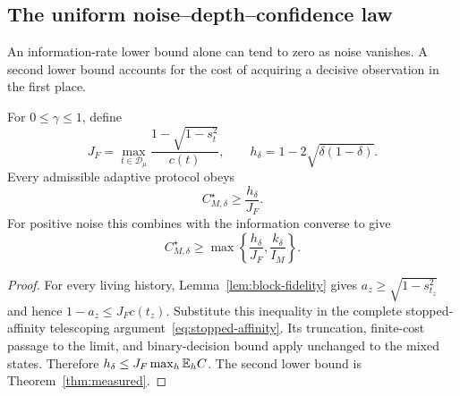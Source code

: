 \subsection{The uniform noise--depth--confidence law}
\label{sec:uniform-cost}
An information-rate lower bound alone can tend to zero as noise
vanishes. A second lower bound accounts for the cost of acquiring a
decisive observation in the first place.

\begin{proposition}
\label{prop:full-affinity}
For $0\leq\gamma\leq1$, define
\begin{equation}\label{eq:affinity-rate}
 J_F=\max_{t\in\mathcal D_\mu}
       \frac{1-\sqrt{1-s_t^2}}{c(t)},\qquad
 h_\delta=1-2\sqrt{\delta(1-\delta)}.
\end{equation}
Every admissible adaptive protocol obeys
\begin{equation}\label{eq:full-affinity-bound}
 C_{M,\delta}^\star\geq\frac{h_\delta}{J_F}.
\end{equation}
For positive noise this combines with the information converse to give
\begin{equation}\label{eq:joint-converse}
 C_{M,\delta}^\star\geq
 \max\left\{\frac{h_\delta}{J_F},\frac{k_\delta}{I_M}\right\}.
\end{equation}
\end{proposition}
\begin{proof}
For every living history, Lemma~\ref{lem:block-fidelity} gives
$a_z\geq\sqrt{1-s_{t_z}^2}$ and hence
$1-a_z\leq J_Fc(t_z)$. Substitute this inequality in the complete
stopped-affinity telescoping argument~\eqref{eq:stopped-affinity}.
Its truncation, finite-cost passage to the limit, and binary-decision
bound apply unchanged to the mixed states. Therefore
$h_\delta\leq J_F\max_h\mathbb E_h C$. The second lower bound is
Theorem~\ref{thm:measured}.
\end{proof}

